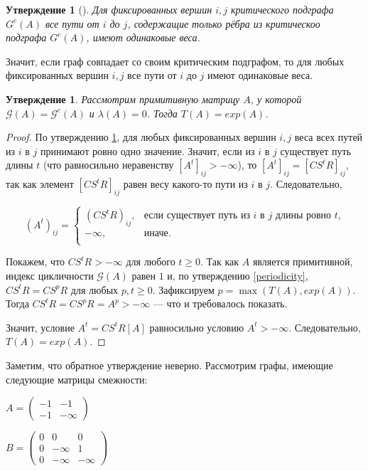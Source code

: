 \documentclass[12pt]{article}
\newtheorem{proposition}[theorem]{Утверждение}
\theoremstyle{definition}
\begin{document}
\begin{proposition} [{\cite[следствие 3.97]{synchronizationAndLinearity}}]
\label{sameWeight}
Для фиксированных вершин $i, j$ критического подграфа $G^c(A)$ все пути от $i$ до $j$, содержащие только рёбра из критическоо подграфа $G^c(A)$, имеют одинаковые веса.
\end{proposition}

Значит, если граф совпадает со своим критическим подграфом, то для любых фиксированных вершин $i, j$ все пути от $i$ до $j$ имеют одинаковые веса.

\begin{proposition} \label{onePathProposition}
Рассмотрим примитивную матрицу $A$, у которой $\mathcal{G}(A) = \mathcal{G}^c(A)$ и $\lambda(A) = 0$. Тогда $T(A) = exp(A)$.
\end{proposition}
\begin{proof}
По утверждению \ref{sameWeight}, для любых фиксированных вершин $i, j$ веса всех путей из $i$ в $j$ принимают ровно одно значение. Значит, если из $i$ в $j$ существует путь длины $t$ (что равносильно неравенству $[A^t]_{ij} > -\infty$), то $[A^t]_{ij} = [CS^tR]_{ij}$, так как элемент $[CS^tR]_{ij}$ равен весу какого-то пути из $i$ в $j$. Следовательно,

\begin{equation*}
(A^t)_{ij} = \begin{cases}(CS^tR)_{ij}, &\text{если существует путь из $i$ в $j$ длины ровно $t$,}\\
-\infty, & \text{иначе.}\\
\end{cases}
\end{equation*}

Покажем, что $CS^tR > -\infty$ для любого $t \ge 0$. Так как $A$ является примитивной, индекс цикличности $\mathcal{G}(A)$ равен $1$ и, по утверждению \ref{periodicity}, $CS^tR = CS^pR$ для любых $p, t \ge 0$. Зафиксируем $p = \max(T(A), exp(A))$. Тогда $CS^tR = CS^pR = A^p > -\infty$ --- что и требовалось показать.

Значит, условие $A^t = CS^tR[A]$ равносильно условию $A^t > -\infty$. Следовательно, $T(A) = exp(A)$.
\end{proof}

Заметим, что обратное утверждение неверно. Рассмотрим графы, имеющие следующие матрицы смежности:

\begin{minipage}[t]{0.4\textwidth}
\centering
$A = \begin{pmatrix}
    -1 & -1 \\
    -1 & -\infty
    \end{pmatrix}$
\end{minipage}
\begin{minipage}[t]{0.4\textwidth}
\centering
$B = \begin{pmatrix}
    0 & 0 & 0 \\
    0 & -\infty & 1 \\
    0 & -\infty & -\infty
    \end{pmatrix}$
\end{minipage}
\end{document}
